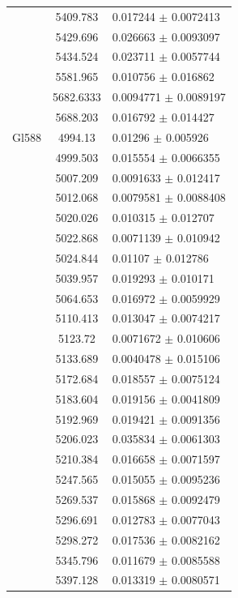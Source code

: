 \begin{longtable}{|c|c|l|}
 & 5409.783 & 0.017244 $\pm$ 0.0072413 \\       
 & 5429.696 & 0.026663 $\pm$ 0.0093097 \\       
 & 5434.524 & 0.023711 $\pm$ 0.0057744 \\       
 & 5581.965 & 0.010756 $\pm$ 0.016862 \\        
 & 5682.6333 & 0.0094771 $\pm$ 0.0089197 \\     
 & 5688.203 & 0.016792 $\pm$ 0.014427 \\        
\hline                                          
Gl588 & 4994.13 & 0.01296 $\pm$ 0.005926 \\     
 & 4999.503 & 0.015554 $\pm$ 0.0066355 \\       
 & 5007.209 & 0.0091633 $\pm$ 0.012417 \\       
 & 5012.068 & 0.0079581 $\pm$ 0.0088408 \\      
 & 5020.026 & 0.010315 $\pm$ 0.012707 \\        
 & 5022.868 & 0.0071139 $\pm$ 0.010942 \\       
 & 5024.844 & 0.01107 $\pm$ 0.012786 \\         
 & 5039.957 & 0.019293 $\pm$ 0.010171 \\        
 & 5064.653 & 0.016972 $\pm$ 0.0059929 \\       
 & 5110.413 & 0.013047 $\pm$ 0.0074217 \\       
 & 5123.72 & 0.0071672 $\pm$ 0.010606 \\        
 & 5133.689 & 0.0040478 $\pm$ 0.015106 \\       
 & 5172.684 & 0.018557 $\pm$ 0.0075124 \\       
 & 5183.604 & 0.019156 $\pm$ 0.0041809 \\       
 & 5192.969 & 0.019421 $\pm$ 0.0091356 \\       
 & 5206.023 & 0.035834 $\pm$ 0.0061303 \\       
 & 5210.384 & 0.016658 $\pm$ 0.0071597 \\       
 & 5247.565 & 0.015055 $\pm$ 0.0095236 \\       
 & 5269.537 & 0.015868 $\pm$ 0.0092479 \\       
 & 5296.691 & 0.012783 $\pm$ 0.0077043 \\       
 & 5298.272 & 0.017536 $\pm$ 0.0082162 \\       
 & 5345.796 & 0.011679 $\pm$ 0.0085588 \\       
 & 5397.128 & 0.013319 $\pm$ 0.0080571 \\       

\end{longtable}
